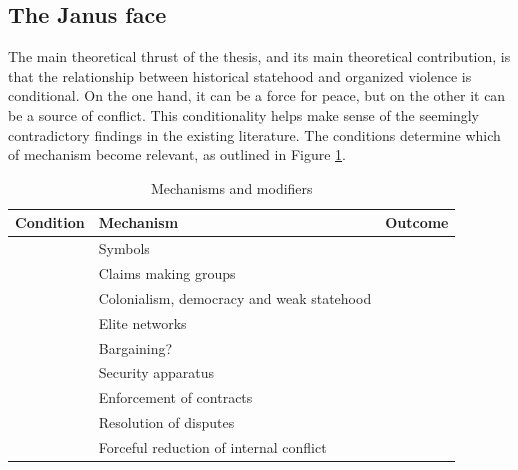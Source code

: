
\subsection{The Janus face}
\label{Janus}


The main theoretical thrust of the thesis, and its main theoretical
contribution, is that the relationship between historical statehood and
organized violence is conditional. On the one hand, it can be a force for peace,
but on the other it can be a source of conflict. This conditionality helps make
sense of the seemingly contradictory findings in the existing literature. The
conditions determine which of mechanism become relevant, as outlined in Figure
\ref{Mechanisms and modifiers}.

\begin{table}[hpbt]
	\begin{tabularx}{\textwidth}{>{\centering\arraybackslash}X>{\centering\arraybackslash}X>{\centering\arraybackslash}X}
	\textbf{Condition} & \textbf{Mechanism} & \textbf{Outcome} \\
\toprule
	\multirow{4}{=}{\centering{Number and far from capital}} & Symbols & \multirow{4}{=}{\centering{Conflict}} \\
    	\cmidrule{2-2}
	& Claims making groups & \\
    	\cmidrule{2-2}
	& Colonialism, democracy and weak statehood & \\
	\cmidrule{2-2}
	& Elite networks & \\
\midrule
	\multirow{2}{=}{\centering{Near to capital}} &  Bargaining? & \multirow{5}{=}{\centering{Peace}} \\
	\cmidrule{2-2}
	& Security apparatus & \\
		\cmidrule{1-2}
	\multirow{3}{=}{\centering{Type of violence}} & Enforcement of contracts & \\
		\cmidrule{2-2}
	& Resolution of disputes  & \\
		\cmidrule{2-2}
	& Forceful reduction of internal conflict & \\
	\bottomrule
\end{tabularx}
\caption{Mechanisms and modifiers}
\label{Mechanisms and modifiers}
\end{table}

